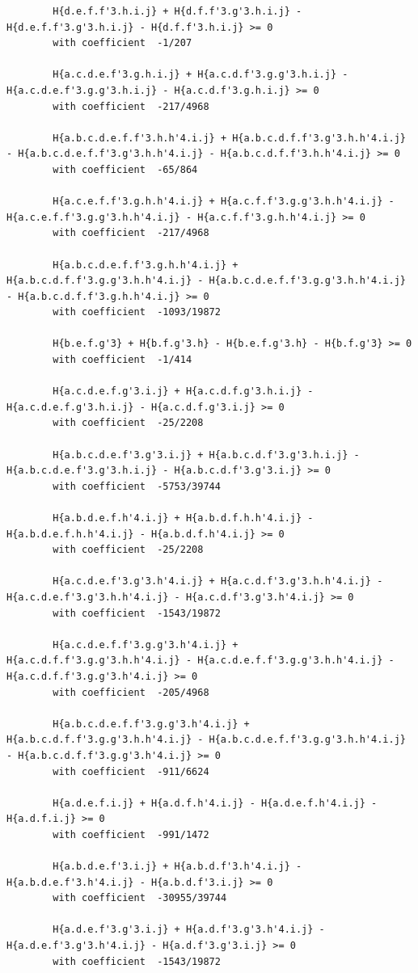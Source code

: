 \documentclass[11pt, a4paper]{kybernetika}
\begin{document}
\begin{verbatim}
		H{d.e.f.f'3.h.i.j} + H{d.f.f'3.g'3.h.i.j} - H{d.e.f.f'3.g'3.h.i.j} - H{d.f.f'3.h.i.j} >= 0
		with coefficient  -1/207
		
		H{a.c.d.e.f'3.g.h.i.j} + H{a.c.d.f'3.g.g'3.h.i.j} - H{a.c.d.e.f'3.g.g'3.h.i.j} - H{a.c.d.f'3.g.h.i.j} >= 0
		with coefficient  -217/4968
		
		H{a.b.c.d.e.f.f'3.h.h'4.i.j} + H{a.b.c.d.f.f'3.g'3.h.h'4.i.j} - H{a.b.c.d.e.f.f'3.g'3.h.h'4.i.j} - H{a.b.c.d.f.f'3.h.h'4.i.j} >= 0
		with coefficient  -65/864
		
		H{a.c.e.f.f'3.g.h.h'4.i.j} + H{a.c.f.f'3.g.g'3.h.h'4.i.j} - H{a.c.e.f.f'3.g.g'3.h.h'4.i.j} - H{a.c.f.f'3.g.h.h'4.i.j} >= 0
		with coefficient  -217/4968
		
		H{a.b.c.d.e.f.f'3.g.h.h'4.i.j} + H{a.b.c.d.f.f'3.g.g'3.h.h'4.i.j} - H{a.b.c.d.e.f.f'3.g.g'3.h.h'4.i.j} - H{a.b.c.d.f.f'3.g.h.h'4.i.j} >= 0
		with coefficient  -1093/19872
		
		H{b.e.f.g'3} + H{b.f.g'3.h} - H{b.e.f.g'3.h} - H{b.f.g'3} >= 0
		with coefficient  -1/414
		
		H{a.c.d.e.f.g'3.i.j} + H{a.c.d.f.g'3.h.i.j} - H{a.c.d.e.f.g'3.h.i.j} - H{a.c.d.f.g'3.i.j} >= 0
		with coefficient  -25/2208
		
		H{a.b.c.d.e.f'3.g'3.i.j} + H{a.b.c.d.f'3.g'3.h.i.j} - H{a.b.c.d.e.f'3.g'3.h.i.j} - H{a.b.c.d.f'3.g'3.i.j} >= 0
		with coefficient  -5753/39744
		
		H{a.b.d.e.f.h'4.i.j} + H{a.b.d.f.h.h'4.i.j} - H{a.b.d.e.f.h.h'4.i.j} - H{a.b.d.f.h'4.i.j} >= 0
		with coefficient  -25/2208
		
		H{a.c.d.e.f'3.g'3.h'4.i.j} + H{a.c.d.f'3.g'3.h.h'4.i.j} - H{a.c.d.e.f'3.g'3.h.h'4.i.j} - H{a.c.d.f'3.g'3.h'4.i.j} >= 0
		with coefficient  -1543/19872
		
		H{a.c.d.e.f.f'3.g.g'3.h'4.i.j} + H{a.c.d.f.f'3.g.g'3.h.h'4.i.j} - H{a.c.d.e.f.f'3.g.g'3.h.h'4.i.j} - H{a.c.d.f.f'3.g.g'3.h'4.i.j} >= 0
		with coefficient  -205/4968
		
		H{a.b.c.d.e.f.f'3.g.g'3.h'4.i.j} + H{a.b.c.d.f.f'3.g.g'3.h.h'4.i.j} - H{a.b.c.d.e.f.f'3.g.g'3.h.h'4.i.j} - H{a.b.c.d.f.f'3.g.g'3.h'4.i.j} >= 0
		with coefficient  -911/6624
		
		H{a.d.e.f.i.j} + H{a.d.f.h'4.i.j} - H{a.d.e.f.h'4.i.j} - H{a.d.f.i.j} >= 0
		with coefficient  -991/1472
		
		H{a.b.d.e.f'3.i.j} + H{a.b.d.f'3.h'4.i.j} - H{a.b.d.e.f'3.h'4.i.j} - H{a.b.d.f'3.i.j} >= 0
		with coefficient  -30955/39744
		
		H{a.d.e.f'3.g'3.i.j} + H{a.d.f'3.g'3.h'4.i.j} - H{a.d.e.f'3.g'3.h'4.i.j} - H{a.d.f'3.g'3.i.j} >= 0
		with coefficient  -1543/19872
		

\end{verbatim}
\end{document}
